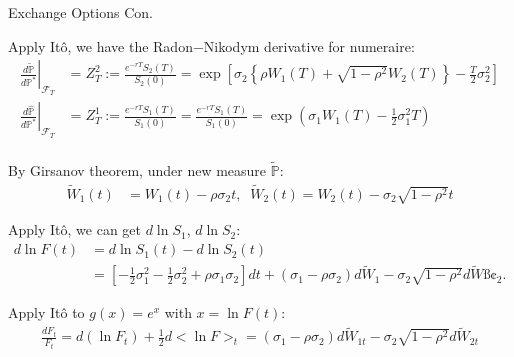 \documentclass{beamer}
\begin{document}
\begin{frame}{Exchange Options Con.}

    {\footnotesize \footnotesize
    \par Apply Itô, we have the Radon$-$Nikodym derivative for numeraire:
    \begin{align*}
        \left.\frac{d\tilde{\mathbb{P}}}{d\mathbb{P}^*}\right|_{\mathcal{F}_T}& = Z_T^2 := \frac{e^{-rT} S_2(T)}{S_2(0)} = \exp \left[ \sigma_2 
        \left\{ \rho W_1(T) + \sqrt{1 - \rho^2} W_2(T) \right\} - \frac{T}{2} \sigma_2^2 \right]\\
        \left.\frac{d\hat{\mathbb{P}}}{d\mathbb{P}^*}\right|_{\mathcal{F}_T}& = Z_T^1 := \frac{e^{-rT} S_1(T)}{S_1(0)} 
        =\frac{e^{-rT}S_1(T)}{S_1(0)} = \exp\left(\sigma_1 W_1(T) - \frac{1}{2}\sigma_1^2 T\right)\\
    \end{align*}

    \vspace{-2em}\pause
    \par By Girsanov theorem, under new measure $\tilde{\mathbb{P}}$:
    \begin{align*}
        \tilde{W}_1(t) &= W_1(t) - \rho\sigma_2 t, \;\; \tilde{W}_2(t) = W_2(t) - \sigma_2\sqrt{1-\rho^2} t
    \end{align*}\pause
    \par Apply Itô, we can get $d\ln S_1$, $d\ln S_2$:
    \begin{align*}
        d \ln F(t) &= d \ln S_1(t) - d \ln S_2(t) \\
        &= \left[  - \tfrac{1}{2}\sigma_1^2  - \tfrac{1}{2}\sigma_2^2 + \rho \sigma_1 \sigma_2 \right] dt 
        + (\sigma_1 - \rho \sigma_2) d\tilde{W}_1 - \sigma_2 \sqrt{1-\rho^2} d\tilde{W}ß¢_2.
    \end{align*}
    \par Apply Itô to $g(x) = e^x$ with $x = \ln F(t)$:
    \begin{align*}
        \frac{dF_t}{F_t} = d(\ln F_t) + \frac{1}{2} d<\ln F>_t 
        = (\sigma_1 - \rho\sigma_2) d\tilde{W}_{1t} - \sigma_2 \sqrt{1 - \rho^2} d\tilde{W}_{2t}
    \end{align*}
    }
\end{frame}
\end{document}
